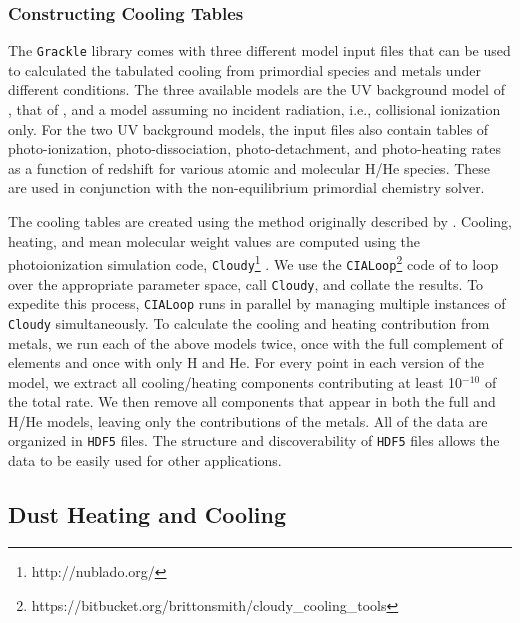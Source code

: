 \subsubsection{Constructing Cooling Tables} \label{sec:cooling-tables}

The \texttt{Grackle} library comes with three different model input files that can be
used to calculated the tabulated cooling from primordial species and
metals under different conditions.  The three available models are the
UV background model of \citet{2009ApJ...703.1416F}, that of
\citet{2012ApJ...746..125H}, and a model assuming no incident
radiation, i.e., collisional ionization only.  For the two UV
background models, the input files also contain tables of
photo-ionization, photo-dissociation, photo-detachment, and
photo-heating rates as a function of redshift for various atomic and
molecular H/He species.  These are used in conjunction with the
non-equilibrium primordial chemistry solver.

The cooling tables are
created using the method originally described by
\citet{2008MNRAS.385.1443S}.  Cooling, heating, and mean molecular
weight values are computed using the photoionization simulation code, 
\texttt{Cloudy}\footnote{http://nublado.org/}
\citep{2013RMxAA..49..137F}.  We use the
\texttt{CIALoop}\footnote{https://bitbucket.org/brittonsmith/cloudy\_cooling\_tools}
code of \citet{2008MNRAS.385.1443S} to loop over the appropriate
parameter space, call \texttt{Cloudy}, and collate the results.  To
expedite this process, \texttt{CIALoop} runs in parallel by managing
multiple instances of \texttt{Cloudy} simultaneously.  To calculate
the cooling and heating contribution from metals, we run each of the
above models twice, once with the full complement of elements and once
with only H and He.  For every point in each version of the model, we
extract all cooling/heating components contributing at least
10$^{-10}$ of the total rate.  We then remove all components that
appear in both the full and H/He models, leaving only the
contributions of the metals.  All of the data are organized in
\texttt{HDF5} files.  The structure and discoverability of
\texttt{HDF5} files allows the data to be easily used for other
applications.


\subsection{Dust Heating and Cooling}


